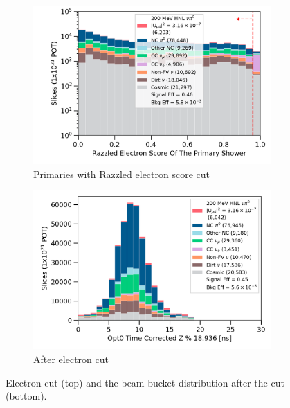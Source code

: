 \begin{figure}[b!]
        \begin{subfigure}[b]{0.495\textwidth}   
            \centering 
            \includegraphics[width=\textwidth]{razzled_electron_score_prim_shw_precut}
            \caption{Primaries with Razzled electron score cut}%
            \label{fig:nrazzled_electron_full}
        \end{subfigure}
        \hfill
        \begin{subfigure}[b]{0.495\textwidth}   
            \centering 
            \includegraphics[width=\textwidth]{beam_bucket_postelectron}
            \caption{After electron cut}%
            \label{fig:bb_post_electron}
        \end{subfigure}
        \caption{
		Electron cut (top) and the beam bucket distribution after the cut (bottom). 
	}
        \label{fig:razzled_electron_cut}
\end{figure}

